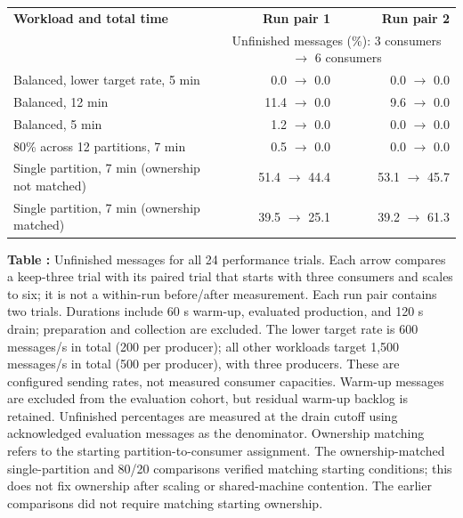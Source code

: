 \begin{center}
\small
\setlength{\tabcolsep}{4pt}
\begin{tabular*}{\linewidth}{@{\extracolsep{\fill}}lrr@{}}
\toprule
\textbf{Workload and total time} & \textbf{Run pair 1} & \textbf{Run pair 2}\\
 & \multicolumn{2}{c}{Unfinished messages (\%): 3 consumers $\rightarrow$ 6 consumers}\\
\midrule
Balanced, lower target rate, 5 min & 0.0 $\rightarrow$ 0.0 & 0.0 $\rightarrow$ 0.0\\
Balanced, 12 min & 11.4 $\rightarrow$ 0.0 & 9.6 $\rightarrow$ 0.0\\
Balanced, 5 min & 1.2 $\rightarrow$ 0.0 & 0.0 $\rightarrow$ 0.0\\
80\% across 12 partitions, 7 min & 0.5 $\rightarrow$ 0.0 & 0.0 $\rightarrow$ 0.0\\
Single partition, 7 min (ownership not matched) & 51.4 $\rightarrow$ 44.4 & 53.1 $\rightarrow$ 45.7\\
Single partition, 7 min (ownership matched) & 39.5 $\rightarrow$ 25.1 & 39.2 $\rightarrow$ 61.3\\
\bottomrule
\end{tabular*}
\label{tab:paired-unfinished}
\par\smallskip
\textbf{Table \thetable:} Unfinished messages for all 24 performance trials. Each arrow compares a keep-three trial with its paired trial that starts with three consumers and scales to six; it is not a within-run before/after measurement. Each run pair contains two trials. Durations include 60 s warm-up, evaluated production, and 120 s drain; preparation and collection are excluded. The lower target rate is 600 messages/s in total (200 per producer); all other workloads target 1,500 messages/s in total (500 per producer), with three producers. These are configured sending rates, not measured consumer capacities. Warm-up messages are excluded from the evaluation cohort, but residual warm-up backlog is retained. Unfinished percentages are measured at the drain cutoff using acknowledged evaluation messages as the denominator. Ownership matching refers to the starting partition-to-consumer assignment. The ownership-matched single-partition and 80/20 comparisons verified matching starting conditions; this does not fix ownership after scaling or shared-machine contention. The earlier comparisons did not require matching starting ownership.
\end{center}
